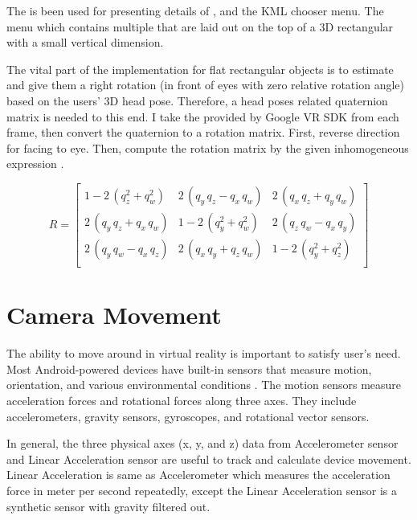 The  is been used for presenting details of , and the KML chooser menu. The menu which contains multiple  that are laid out on the top of a 3D rectangular  with a small vertical dimension.

The vital part of the implementation for flat rectangular objects is to estimate and give them a right rotation (in front of eyes with zero relative rotation angle) based on the users' 3D head pose. Therefore, a head poses related quaternion matrix \cite{jvv.quaternions.2013} is needed to this end. I take the   provided by Google VR SDK from each frame, then convert the quaternion to a rotation matrix. First, reverse direction  for facing to eye. Then, compute the rotation matrix by the given inhomogeneous expression \cite{wiki.quaternion-mat.2016}.

\begin{equation}
\label{equ:quaternion-matrix}
R = 
	\begin{bmatrix}
	1 - 2\,(q_z^2 + q_w^2) & 2\,(q_y\,q_z - q_x\,q_w) & 2\,(q_x\,q_z + q_y\,q_w)\\
	2\,(q_y\,q_z + q_x\,q_w) & 1 - 2\,(q_y^2 + q_w^2) & 2\,(q_z\,q_w - q_x\,q_y)\\
	2\,(q_y\,q_w - q_x\,q_z) & 2\,(q_x\,q_y + q_z\,q_w) & 1 - 2\,(q_y^2 + q_z^2)\\
	\end{bmatrix}
\end{equation}

\section{Camera Movement}

The ability to move around in virtual reality is important to satisfy user's need. Most Android-powered devices have built-in sensors that measure motion, orientation, and various environmental conditions \cite{google.sensors.2016}. The motion sensors measure acceleration forces and rotational forces along three axes. They include accelerometers, gravity sensors, gyroscopes, and rotational vector sensors. 

In general, the three physical axes (x, y, and z) data from Accelerometer sensor and Linear Acceleration sensor are useful to track and calculate device movement. Linear Acceleration is same as Accelerometer which measures the acceleration force in meter per second repeatedly, except the Linear Acceleration sensor is a synthetic sensor with gravity filtered out. 

